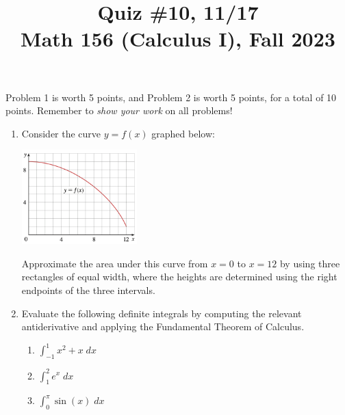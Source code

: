 \documentclass[11pt]{article}
\title{Quiz \#10, 11/17 \\ Math 156 (Calculus I), Fall 2023}
\date{}
\begin{document}
\maketitle

\thispagestyle{empty}

\vspace{-2cm}

Problem 1 is worth 5 points, and Problem 2 is worth 5 points, for a total of 10 points. Remember to \emph{show your work} on all problems!

\begin{enumerate}
\item Consider the curve $y=f(x)$ graphed below:
\vspace{-0.25cm}
\begin{center}\includegraphics[width=1.75in]{quiz10.png}\end{center}
\vspace{-0.3cm}
Approximate the area under this curve from $x=0$ to $x=12$ by using three rectangles of equal width, where the heights are determined using the right endpoints of the three intervals.

\vspace{4cm}

\item Evaluate the following definite integrals by computing the relevant antiderivative and applying the Fundamental Theorem of Calculus.
\begin{enumerate}
\item $\int_{-1}^{1} x^2 + x \; dx$
\item $\int_{1}^{2} e^x \; dx$
\item $\int_{0}^{\pi} \sin(x) \; dx$
\end{enumerate}
\end{enumerate}
\end{document}
